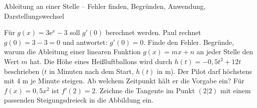 \begin{aufgabe}{Ableitung an einer Stelle – Fehler finden, Begründen, Anwendung, Darstellungswechsel}
\begin{teile}
\teil Für $g(x) = 3\mathrm{e}^x - 3$ soll $g'(0)$ berechnet werden. Paul rechnet $g(0) = 3 - 3 = 0$ und antwortet: $g'(0) = 0$. Finde den Fehler.
\teil Begründe, warum die Ableitung einer linearen Funktion $g(x) = mx + n$ an jeder Stelle den Wert $m$ hat.
\teil Die Höhe eines Heißluftballons wird durch $h(t) = -0{,}5t^2 + 12t$ beschrieben ($t$ in Minuten nach dem Start, $h(t)$ in m). Der Pilot darf höchstens mit $4$ m je Minute steigen. Ab welchem Zeitpunkt hält er die Vorgabe ein?
\teil Für $f(x) = 0{,}5x^2$ ist $f'(2) = 2$. Zeichne die Tangente im Punkt $(2 | 2)$ mit einem passenden Steigungsdreieck in die Abbildung ein.

\begin{ksys}[xmin=-1,xmax=4,ymin=-1,ymax=6,ablesen]\end{ksys}
\end{teile}
\end{aufgabe}

